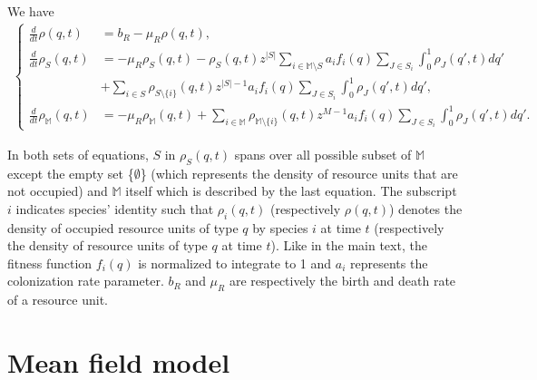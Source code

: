 \documentclass[8pt,a4paper]{article}
\begin{document}
We have
\begin{eqnarray*}
\begin{cases}
\displaystyle{\frac{d}{dt}}\rho(q,t) &= b_R-\mu_R \rho(q,t), \\
\displaystyle{\frac{d}{dt}}\rho_{S}(q,t) &= -\mu_R \rho_S(q,t) -\rho_S(q,t)z^{|S|} \sum_{i \in \mathbb{M} \setminus S} a_i f_i(q) \sum_{J \in S_i} \int_0^1 \rho_J(q',t) dq' \\
& + \sum_{i \in S} \rho_{S \setminus{\{i\}}}(q,t) z^{|S|-1} a_i f_i(q) \sum_{J \in S_i} \int_0^1 \rho_J(q',t) dq', \\
\displaystyle{\frac{d}{dt}} \rho_{\mathbb{M}}(q,t) &= - \mu_R \rho_{\mathbb{M}}(q,t) + \sum_{i \in \mathbb{M}} \rho_{\mathbb{M} \setminus{\{i\}}}(q,t) z^{M-1} a_i f_i(q) \sum_{J \in S_i} \int_0^1 \rho_J(q',t) dq'.
\end{cases}
\end{eqnarray*}

In both sets of equations, $S$ in $\rho_S(q,t)$ spans over all possible subset of $\mathbb{M}$ except the empty set \{$\emptyset$\} (which represents the density of resource units that are not occupied) and $\mathbb{M}$  itself which is described by the last equation. The subscript $i$ indicates species' identity such that
$ \rho_i (q,t)$ (respectively $\rho(q,t)$) denotes the density of occupied resource units of type $q$ by species $i$ at time $t$ (respectively the density of resource units of type $q$ at time $t$).
Like in the main text, the fitness function $f_i(q)$ is normalized to integrate to 1 and $a_i $  represents the colonization rate parameter. $b_R$ and $\mu_R$ are respectively the birth and death rate of a resource unit. 


\section{Mean field model}
\end{document}
